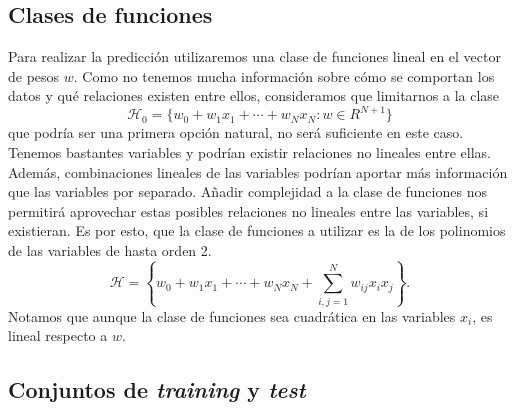 \documentclass[a4paper, 20pt]{article}
\begin{document}

\subsection{Clases de funciones}
Para realizar la predicción utilizaremos una clase de funciones lineal en el vector de pesos $w$. Como no tenemos mucha información sobre cómo se comportan los datos y qué relaciones existen entre ellos, consideramos que limitarnos a la clase \[
\mathcal{H}_0 = \{w_0 + w_1x_1 +\cdots + w_Nx_N : w \in R^{N+1}\}
\]
que podría ser una primera opción natural, no será suficiente en este caso. Tenemos bastantes variables y podrían existir relaciones no lineales entre ellas. Además, combinaciones lineales de las variables podrían aportar más información que las variables por separado. Añadir complejidad a la clase de funciones nos permitirá aprovechar estas posibles relaciones no lineales entre las variables, si existieran. Es por esto, que la clase de funciones a utilizar es la de los polinomios de las variables de hasta orden 2.
 \[
\mathcal{H} = \left \{w_0 + w_1x_1 +\cdots + w_Nx_N + \sum_{i,j = 1}^Nw_{ij} x_ix_j\right\}.
\]
Notamos que aunque la clase de funciones sea cuadrática en las variables $x_i$, es lineal respecto a $w$.


\subsection{Conjuntos de \textit{training} y \textit{test}}
\end{document}
